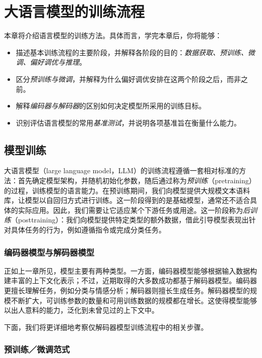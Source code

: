 \chapter[大语言模型训练流程]{大语言模型的训练流程}\label{chap:pipeline}

\begin{learningbox}
本章将介绍语言模型的训练方法。具体而言，学完本章后，你将能够：
\begin{itemize}[leftmargin=*, nosep]
    \item 描述基本训练流程的主要阶段，并解释各阶段的目的：{\em 数据获取、预训练、微调、偏好调优与推理}。
    \item 区分{\em 预训练与微调}，并解释为什么偏好调优安排在这两个阶段之后，而非之前。
    \item 解释{\em 编码器与解码器}的区别如何决定模型所采用的训练目标。
    \item 识别评估语言模型的常用{\em 基准测试}，并说明各项基准旨在衡量什么能力。
\end{itemize}
\end{learningbox}

\section{模型训练}

大语言模型（large language model，LLM）的训练流程遵循一套相对标准的方法：首先确定模型架构，并随机初始化参数，随后通过称为{\em 预训练}（pretraining）的过程，训练模型的语言能力。在预训练期间，我们向模型提供大规模文本语料库，让模型以自回归方式进行训练。这一阶段得到的是基础模型，通常还不适合具体的实际应用。因此，我们需要让它适应某个下游任务或用途。这一阶段称为{\em 后训练}（posttraining）：我们向模型提供特定类型的额外数据，借此引导模型表现出针对具体任务的行为，例如遵循指令或完成分类任务。

\subsection{编码器模型与解码器模型}
正如上一章所见，模型主要有两种类型。一方面，编码器模型能够根据输入数据构建丰富的上下文化表示；不过，近期取得的大多数成功都基于解码器模型。编码器更擅长理解任务，例如分类与情感分析；解码器则擅长生成任务。解码器模型的规模不断扩大，可训练参数的数量和可用训练数据的规模都在增长。这使得模型能够以出人意料的能力，泛化到未曾见过的上下文中。

下面，我们将更详细地考察仅解码器模型训练流程中的相关步骤。

\subsection{预训练／微调范式}

